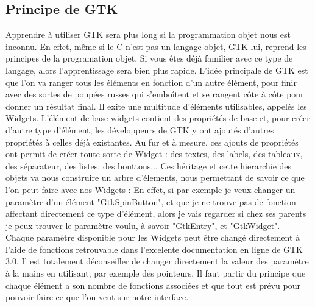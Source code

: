 \documentclass[11pt,french,a4paper]{report}
\begin{document}
        \subsection{Principe de GTK}
Apprendre à utiliser GTK sera plus long si la programmation objet nous est inconnu. En effet, même si le C n'est pas un langage objet, GTK lui, reprend 
les principes de la programation objet. Si vous êtes déjà familier avec ce type de langage, alors l'apprentissage sera bien plus rapide.  
L'idée principale de GTK est que l'on va ranger tous les éléments en fonction d'un autre élément, pour finir avec des sortes de poupées russes qui s'emboîtent 
et se rangent côte à côte pour donner un résultat final. Il exite une multitude d'éléments utilisables, appelés les Widgets. L'élément de base widgets contient des propriétés de 
base et, pour créer d'autre type d'élément, les développeurs de GTK y ont ajoutés d'autres propriétés à celles déjà existantes. 
Au fur et à mesure, ces ajouts de propriétés ont permit de créer toute sorte de Widget : des textes, des labels, des tableaux, des séparateur, des listes, des bouttons... 
Ces héritage et cette hierarchie des objets va nous construire un arbre d'élements, nous permettant de savoir ce que l'on peut faire avec nos Widgets : 
En effet, si par exemple je veux changer un paramètre d'un élément "GtkSpinButton", et que je ne trouve pas de fonction affectant directement ce type d'élément, 
alors je vais regarder si chez ses parents je peux trouver le paramètre voulu, à savoir "GtkEntry", et "GtkWidget". \\

Chaque paramètre disponible pour les Widgets peut être changé directement à l'aide de fonctions retrouvable dans l'excelente documentation en ligne de GTK 3.0. 
Il est totalement déconseiller de changer directement la valeur des paramètre à la mains en utilisant, par exemple des pointeurs. Il faut partir du principe que 
chaque élément a son nombre de fonctions associées et que tout est prévu pour pouvoir faire ce que l'on veut sur notre interface. \\ 
\\
\end{document}
